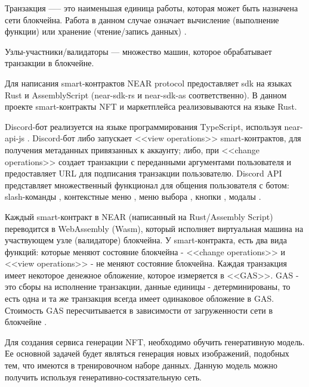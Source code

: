 \begin{definition}
    Транзакция —-- это наименьшая единица работы, которая может быть назначена сети блокчейна. Работа в данном случае означает вычисление (выполнение функции) или хранение (чтение/запись данных) \cite{neardocumentationtransaction}.
\end{definition}

\begin{definition}
    Узлы-участники/валидаторы --- множество машин, которое обрабатывает транзакции в блокчейне.
\end{definition}

Для написания smart-контрактов NEAR protocol предоставляет sdk на языках Rust и AssemblyScript (near-sdk-rs \cite{nearsdkrs} и near-sdk-as \cite{nearsdkas} соответственно). В данном проекте smart-контракты NFT и маркетплейса реализовываются на языке Rust.

Discord-бот реализуется на языке программирования TypeScript, используя near-api-js \cite{nearapijs}. Discord-бот либо запускает <<view operations>> smart-контрактов, для получения метаданных привязанных к аккаунту; либо, при <<change operations>> создает транзакции с переданными аргументами пользователя и предоставляет URL для подписания транзакции пользователю. Discord API представляет множественный функционал для общения пользователя с ботом: slash-команды \cite{discordjsbuttons}, контекстные меню \cite{discordtscontextmenu}, меню выбора \cite{discordjsselectmenus}, кнопки \cite{discordjsbuttons}, модалы \cite{discordjsmodals}.


\begin{remark}
    Каждый smart-контракт в NEAR (написанный на Rust/Assembly Script) переводится в WebAssembly (Wasm), который исполняет виртуальная машина на участвующем узле (валидаторе) блокчейна. У smart-контракта, есть два вида функций: которые меняют состояние блокчейна - <<change operations>> и <<view operations>> - не меняют состояние блокчейна. Каждая транзакция имеет некоторое денежное обложение, которое измеряется в <<GAS>>. GAS - это сборы на исполнение транзакции, данные единицы - детерминированы, то есть одна и та же транзакция всегда имеет одинаковое обложение в GAS. Стоимость GAS пересчитывается в зависимости от загруженности сети в блокчейне \cite{neargas}.
\end{remark}

Для создания сервиса генерации NFT, необходимо обучить генеративную модель. Ее основной задачей будет являться генерация новых изображений, подобных тем, что имеются в тренировочном наборе данных. Данную модель можно получить используя генеративно-состязательную сеть.

